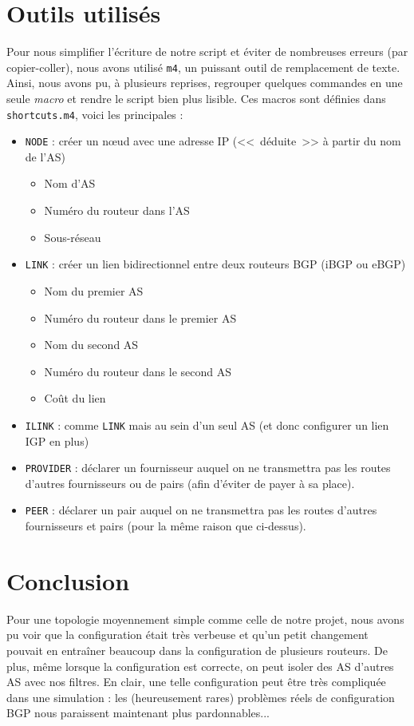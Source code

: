 \documentclass[10pt,a4paper,twocolumn]{article}
\begin{document}
\section{Outils utilisés}
Pour nous simplifier l'écriture de notre script et éviter de nombreuses erreurs (par copier-coller), nous avons utilisé \texttt{m4}, un puissant outil de remplacement de texte.
Ainsi, nous avons pu, à plusieurs reprises, regrouper quelques commandes en une seule \textit{macro} et rendre le script bien plus lisible. Ces macros sont définies dans \texttt{shortcuts.m4}, voici les principales :
\begin{itemize}
\item \texttt{NODE} : créer un nœud avec une adresse IP (<<~déduite~>> à partir du nom de l'AS)
	\begin{itemize}
		\item Nom d'AS
		\item Numéro du routeur dans l'AS
		\item Sous-réseau
	\end{itemize}
\item \texttt{LINK} : créer un lien bidirectionnel entre deux routeurs BGP (iBGP ou eBGP)
	\begin{itemize}
		\item Nom du premier AS
		\item Numéro du routeur dans le premier AS
		\item Nom du second AS
		\item Numéro du routeur dans le second AS
		\item Coût du lien
	\end{itemize}
\item \texttt{ILINK} : comme \texttt{LINK} mais au sein d'un seul AS (et donc configurer un lien IGP en plus)
\item \texttt{PROVIDER} : déclarer un fournisseur auquel on ne transmettra pas les routes d'autres fournisseurs ou de pairs (afin d'éviter de payer à sa place).
\item \texttt{PEER} : déclarer un pair auquel on ne transmettra pas les routes d'autres fournisseurs et pairs (pour la même raison que ci-dessus).
\end{itemize}

\section{Conclusion}
Pour une topologie moyennement simple comme celle de notre projet, nous avons pu voir que la configuration était très verbeuse et qu'un petit changement pouvait en entraîner beaucoup dans la configuration de plusieurs routeurs. De plus,
même lorsque la configuration est correcte, on peut isoler des AS d'autres AS avec nos filtres.
En clair, une telle configuration peut être très compliquée dans une simulation : les (heureusement rares) problèmes réels de configuration BGP nous paraissent maintenant plus pardonnables...
\end{document}
